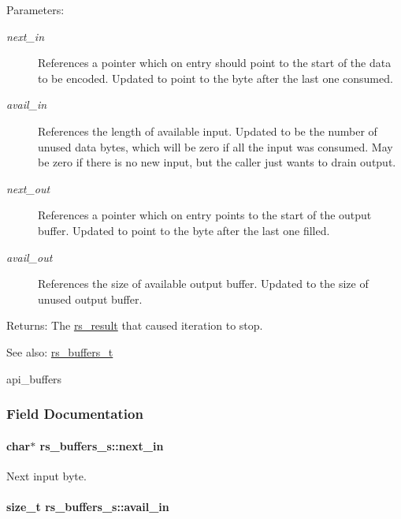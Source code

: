 \begin{Desc}
\item[Parameters:]
\begin{description}
\item[{\em next\_\-in}]References a pointer which on entry should point to the start of the data to be encoded. Updated to point to the byte after the last one consumed.\item[{\em avail\_\-in}]References the length of available input. Updated to be the number of unused data bytes, which will be zero if all the input was consumed. May be zero if there is no new input, but the caller just wants to drain output.\item[{\em next\_\-out}]References a pointer which on entry points to the start of the output buffer. Updated to point to the byte after the last one filled.\item[{\em avail\_\-out}]References the size of available output buffer. Updated to the size of unused output buffer.\end{description}
\end{Desc}
\begin{Desc}
\item[Returns:]The \hyperlink{librsync_8h_7feb858ceba3b8f3cf048d49be108253}{rs\_\-result} that caused iteration to stop.\end{Desc}
\begin{Desc}
\item[See also:]\hyperlink{librsync_8h_bf9f543dbfe5c1e60c8ed1c93d087767}{rs\_\-buffers\_\-t} 

api\_\-buffers \end{Desc}


\subsubsection{Field Documentation}
\hypertarget{structrs__buffers__s_6d5d12a1ced9a3a8891259e09c80ec20}{
\paragraph[next\_\-in]{\setlength{\rightskip}{0pt plus 5cm}char$\ast$ {\bf rs\_\-buffers\_\-s::next\_\-in}}\hfill}
\label{structrs__buffers__s_6d5d12a1ced9a3a8891259e09c80ec20}


Next input byte. 

\hypertarget{structrs__buffers__s_7bd5f1ea3c26587bf1106c1594712735}{
\paragraph[avail\_\-in]{\setlength{\rightskip}{0pt plus 5cm}size\_\-t {\bf rs\_\-buffers\_\-s::avail\_\-in}}\hfill}
\label{structrs__buffers__s_7bd5f1ea3c26587bf1106c1594712735}


